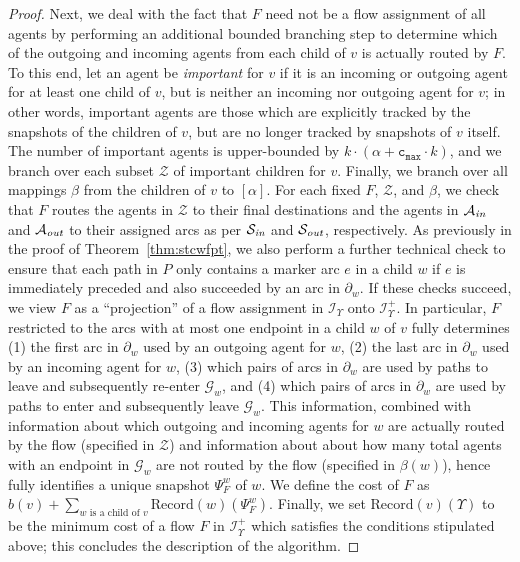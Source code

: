 \documentclass[letterpaper]{article} %
\newcommand{\cmax}{\mathtt{c_{max}}}
\newcommand{\forgottenG}{\mathcal{G}}
\newcommand{\Rec}{\text{Record}}
\newcommand{\Sout}{\mathcal{S}_\emph{out}}
\newcommand{\Sin}{\mathcal{S}_\emph{in}}
\newcommand{\Aout}{\mathcal{A}_\emph{out}}
\newcommand{\Ain}{\mathcal{A}_\emph{in}}
\newcommand{\Imp}{\mathcal{Z}}
\begin{document}
\begin{proof}
Next, we deal with the fact that $F$ need not be a flow assignment of all agents by performing an additional bounded branching step to determine which of the outgoing and incoming agents from each child of $v$ is actually routed by $F$. To this end, let an agent be \emph{important} for $v$ if it is an incoming or outgoing agent for at least one child of $v$, but is neither an incoming nor outgoing agent for $v$; in other words, important agents are those which are explicitly tracked by the snapshots of the children of $v$, but are no longer tracked by snapshots of $v$ itself. The number of important agents is upper-bounded by $k\cdot (\alpha+\cmax\cdot k)$, and we branch over each subset $\Imp$ of important children for $v$. Finally, we branch over all mappings $\beta$ from the children of $v$ to $[\alpha]$.  For each fixed $F$, $\Imp$, and $\beta$, we check that $F$ routes the agents in $\Imp$ to their final destinations and the agents in $\Ain$ and $\Aout$ to their assigned arcs as per $\Sin$ and $\Sout$, respectively. As previously in the proof of Theorem~\ref{thm:stcwfpt}, we also perform a further technical check to ensure that each path in $P$ only contains a marker arc $e$ in a child $w$ if $e$ is immediately preceded and also succeeded by an arc in $\partial_w$. If these checks succeed, we view $F$ as a ``projection'' of a flow assignment in $\mathcal{I}_\Upsilon$ onto $\mathcal{I}^+_\Upsilon$. In particular, $F$ restricted to the arcs with at most one endpoint in a child $w$ of $v$ fully determines (1) the first arc in $\partial_w$ used by an outgoing agent for $w$, (2) the last arc in $\partial_w$ used by an incoming agent for $w$, (3) which pairs of arcs in $\partial_w$ are used by paths to leave and subsequently re-enter $\forgottenG_w$, and (4) which pairs of arcs in $\partial_w$ are used by paths to enter and subsequently leave $\forgottenG_w$. This information, combined with information about which outgoing and incoming agents for $w$ are actually routed by the flow (specified in $\Imp$) and information about about how many total agents with an endpoint in $\forgottenG_w$ are not routed by the flow (specified in $\beta(w)$), hence fully identifies a unique snapshot $\Psi^w_F$ of $w$. We define the cost of $F$ as $b(v)+\sum_{w\text{ is a child of }v}\Rec(w)(\Psi^w_F)$. Finally, we set $\Rec(v)(\Upsilon)$ to be the minimum cost of a flow $F$ in $\mathcal{I}^+_\Upsilon$ which satisfies the conditions stipulated above; this concludes the description of the algorithm.


\end{proof}
\end{document}

